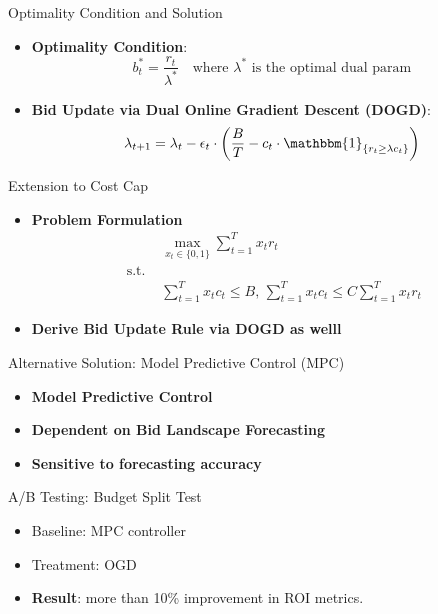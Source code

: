 \documentclass{beamer}
\begin{document}
	\begin{frame}{Optimality Condition and Solution}
		\begin{itemize}
			\item \textbf{Optimality Condition}:
			\[
			b_t^* = \frac{r_t}{\lambda^*}   \quad \text{where }  \lambda^* \text{ is the optimal dual param}
			\]
			\item \textbf{Bid Update via Dual Online Gradient Descent (DOGD)}:
			\[
			\lambda_{t+1} = \lambda_t - \epsilon_t \cdot \left( \frac{B}{T} - c_t \cdot \mathbbm{1}_{\{r_t \geq \lambda c_t\} }\right)
			\]
		\end{itemize}
	\end{frame}


	\begin{frame}{Extension to Cost Cap}
		\begin{itemize}
			\item \textbf{Problem Formulation}
			\begin{align*}
						& \max_{x_t \in  \{0, 1 \}}  \sum_{t=1}^T x_t r_t 
						 \\  \text{ s.t. }  &  
						 \\  &\sum_{t=1}^T x_t c_t \leq B \text{, } \sum_{t=1}^T x_t c_t \leq C \sum_{t=1}^T x_t r_t
			\end{align*}
			
			
			\item \textbf{Derive Bid Update Rule via DOGD as welll}
		
			
		\end{itemize}
		
	\end{frame}
	
	
	\begin{frame}{Alternative Solution: Model Predictive Control (MPC)}
		\begin{itemize}
			\item \textbf{Model Predictive Control}
			\item \textbf{Dependent on Bid Landscape Forecasting} 
			\item \textbf{Sensitive to forecasting accuracy}

		\end{itemize}
	\end{frame}
	
	\begin{frame}{A/B Testing: Budget Split Test}
		\begin{itemize}
			\item Baseline: MPC controller
			\item Treatment: OGD
			\item \textbf{Result}:  more than 10\% improvement in ROI metrics.
		\end{itemize}
	\end{frame}
	
\end{document}
